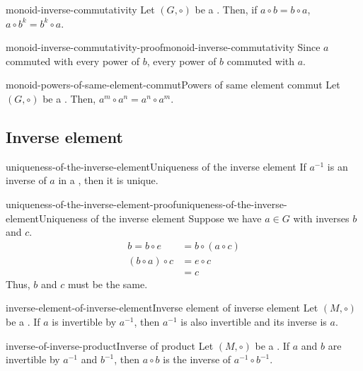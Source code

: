 \documentclass[preview]{standalone}
\begin{document}
\begin{snippetproposition}{monoid-inverse-commutativity}{}
    Let \((G, \circ)\) be a \monoid.
    Then, if \(a\circ b = b\circ a\), \(a\circ b^k = b^k \circ a\).
\end{snippetproposition}

\begin{snippetproof}{monoid-inverse-commutativity-proof}{monoid-inverse-commutativity}{}
    \todo
    Since \(a\) commuted with every power of \(b\), every power of \(b\)
    commuted with \(a\).
\end{snippetproof}

\begin{snippetcorollary}{monoid-powers-of-same-element-commut}{Powers of same element commut}
    Let \((G, \circ)\) be a \monoid.
    Then, \(a^m \circ a^n = a^n \circ a^m\).
\end{snippetcorollary}

\subsection{Inverse element}

\begin{snippettheorem}{uniqueness-of-the-inverse-element}{Uniqueness of the inverse element}
    If \(a^{-1}\) is an inverse of \(a\) in a \monoid, then it is unique.
\end{snippettheorem}

\begin{snippetproof}{uniqueness-of-the-inverse-element-proof}{uniqueness-of-the-inverse-element}{Uniqueness of the inverse element}
    Suppose we have \(a\in G\) with inverses \(b\) and \(c\).
    \begin{align*}
        b = b \circ e &= b \circ (a \circ c) \\
        (b \circ a) \circ c &= e \circ c \\
        &= c
    \end{align*}
    Thus, \(b\) and \(c\) must be the same.
\end{snippetproof}

\begin{snippetproposition}{inverse-element-of-inverse-element}{Inverse element of inverse element}
    Let \((M, \circ)\) be a \monoid. If \(a\) is invertible by \(a^{-1}\),
    then \(a^{-1}\) is also invertible and its inverse is \(a\).
\end{snippetproposition}

\begin{snippetproposition}{inverse-of-inverse-product}{Inverse of product}
    Let \((M, \circ)\) be a \monoid. If \(a\) and \(b\) are invertible by \(a^{-1}\) and \(b^{-1}\),
    then \(a\circ b\) is the inverse of \(a^{-1} \circ b^{-1}\).
\end{snippetproposition}
\end{document}

